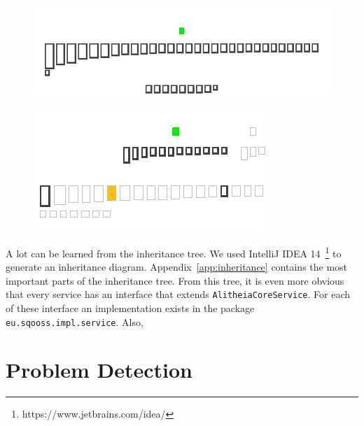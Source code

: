 \documentclass{article}
\begin{document}
\begin{figure}[h]
\centering
\begin{minipage}{.45\textwidth}
  \centering
  \includegraphics[width=0.9\linewidth]{daoobject-inheritance}
  \label{fig:daobject}
\end{minipage}\hspace{5mm}%
\begin{minipage}{.45\textwidth}
  \centering
  \includegraphics[width=0.9\linewidth]{alitheiacoreservice-inheritance}
  \label{fig:alitheiacoreservice}
\end{minipage}
\end{figure}

A lot can be learned from the inheritance tree. We used IntelliJ IDEA 14~\footnote{https://www.jetbrains.com/idea/} to generate an inheritance diagram. Appendix~\ref{app:inheritance} contains the most important parts of the inheritance tree. From this tree, it is even more obvious that every service has an interface that extends \verb|AlitheiaCoreService|. For each of these interface an implementation exists in the package \verb|eu.sqooss.impl.service|. Also, %

\section{Problem Detection}
\end{document}
